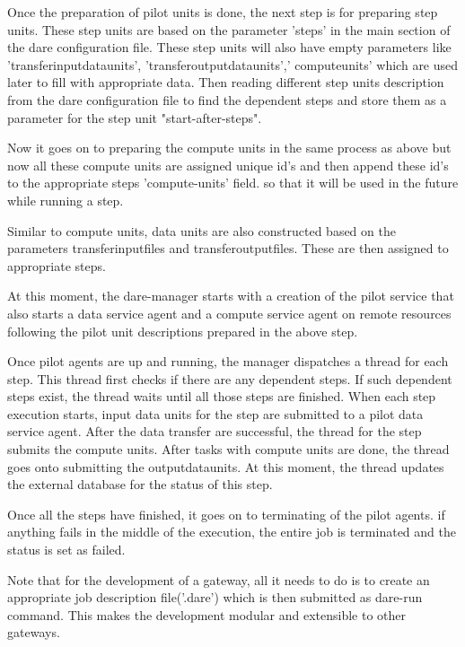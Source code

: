 \documentclass[]{svjour3}
\begin{document}
Once the preparation of pilot units is done, the next step is for preparing step units.  These step units are based on the parameter 'steps' in the main section of the dare configuration file.  These step units will also have empty parameters like 'transfer\textunderscore input\textunderscore data\textunderscore units', 'transfer\textunderscore output\textunderscore data\textunderscore units',' compute\textunderscore units' which are used later to fill with appropriate data.  Then reading different step units description from the dare configuration file to find the dependent steps and store them as a parameter for the step unit "start-after-steps". 

Now it goes on to preparing the compute units in the same process as above  but now all these compute units are assigned unique id's and then append these id's to the appropriate steps 'compute-units'  field. so that it will be used in the future while running a step.

Similar to compute units, data units are also constructed based on the parameters transfer\textunderscore input\textunderscore files and transfer\textunderscore output\textunderscore files. These are then assigned to appropriate steps.

At this moment, the dare-manager starts with a creation of the pilot service that also starts a data service agent and a compute service agent on remote resources following the pilot unit descriptions prepared in the above step.

Once pilot agents are up and running, the manager dispatches a thread for each step. This thread first checks if there are any dependent steps. If such dependent steps exist, the thread waits until all those steps are finished.  When each step execution starts, input data units for the step are submitted to a pilot data service agent.  After the data transfer are successful, the thread for the step submits the compute units.  After tasks with compute units are done, the thread goes onto submitting the output\textunderscore data\textunderscore units. At this moment, the thread updates the external database for the status of this step.

Once all the steps have finished, it goes on to terminating of the pilot agents. if anything fails in the middle of the execution, the entire job is terminated and the status is set as failed. 

Note that for the development of a gateway, all it needs to do is to create an appropriate job description file('.dare') which is then submitted as dare-run command. This makes the development modular and extensible to other gateways.
\end{document}
